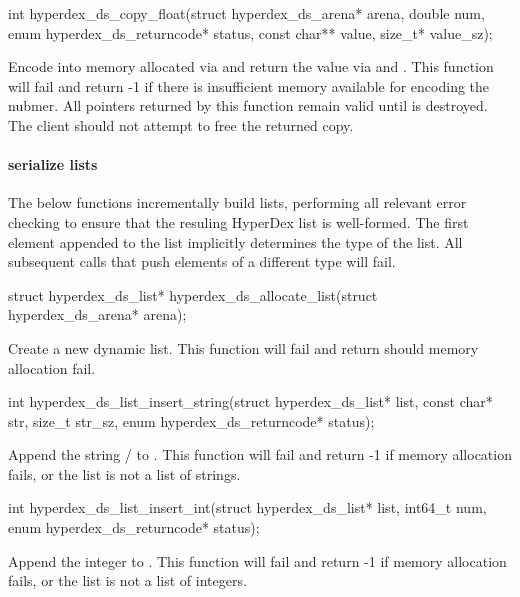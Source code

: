 \funcsep
\begin{ccode}
int hyperdex_ds_copy_float(struct hyperdex_ds_arena* arena, double num,
                           enum hyperdex_ds_returncode* status,
                           const char** value, size_t* value_sz);
\end{ccode}
\funcdesc Encode  into memory allocated via  and return
the value via  and .  This function will fail and
return -1 if there is insufficient memory available for encoding the nubmer.
All pointers returned by this function remain valid until  is
destroyed.  The client should not attempt to free the returned copy.

\paragraph{serialize lists}

The below functions incrementally build lists, performing all relevant error
checking to ensure that the resuling HyperDex list is well-formed.  The first
element appended to the list implicitly determines the type of the list.  All
subsequent calls that push elements of a different type will fail.

\begin{ccode}
struct hyperdex_ds_list* hyperdex_ds_allocate_list(struct hyperdex_ds_arena* arena);
\end{ccode}
\funcdesc Create a new dynamic list.  This function will fail and return
 should memory allocation fail.

\funcsep
\begin{ccode}
int hyperdex_ds_list_insert_string(struct hyperdex_ds_list* list,
                                   const char* str, size_t str_sz,
                                   enum hyperdex_ds_returncode* status);
\end{ccode}
\funcdesc Append the string / to .  This
function will fail and return -1 if memory allocation fails, or the list is not
a list of strings.

\funcsep
\begin{ccode}
int hyperdex_ds_list_insert_int(struct hyperdex_ds_list* list, int64_t num,
                                enum hyperdex_ds_returncode* status);
\end{ccode}
\funcdesc Append the integer  to .  This function will fail
and return -1 if memory allocation fails, or the list is not a list of integers.

